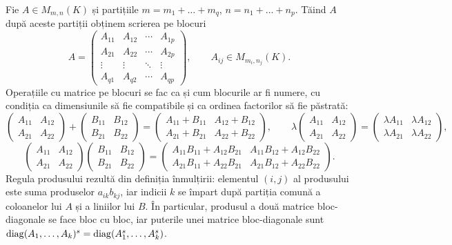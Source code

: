 Fie $A\in M_{m,n}(K)$ și partițiile $m=m_1+\dots+m_q$, $n=n_1+\dots+n_p$. Tăind $A$ după aceste partiții obținem scrierea pe blocuri
\[
A=
\begin{pmatrix}
A_{11} & A_{12} & \cdots & A_{1p}\\
A_{21} & A_{22} & \cdots & A_{2p}\\
\vdots & \vdots & \ddots & \vdots\\
A_{q1} & A_{q2} & \cdots & A_{qp}
\end{pmatrix},
\qquad A_{ij}\in M_{m_i,n_j}(K).
\]
Operațiile cu matrice pe blocuri se fac ca și cum blocurile ar fi numere, cu condiția ca dimensiunile să fie compatibile și ca ordinea factorilor să fie păstrată:
\[
\begin{pmatrix}A_{11}&A_{12}\\A_{21}&A_{22}\end{pmatrix}+\begin{pmatrix}B_{11}&B_{12}\\B_{21}&B_{22}\end{pmatrix}=\begin{pmatrix}A_{11}+B_{11}&A_{12}+B_{12}\\A_{21}+B_{21}&A_{22}+B_{22}\end{pmatrix},\qquad
\lambda\begin{pmatrix}A_{11}&A_{12}\\A_{21}&A_{22}\end{pmatrix}=\begin{pmatrix}\lambda A_{11}&\lambda A_{12}\\\lambda A_{21}&\lambda A_{22}\end{pmatrix},
\]
\[
\begin{pmatrix}A_{11}&A_{12}\\A_{21}&A_{22}\end{pmatrix}\begin{pmatrix}B_{11}&B_{12}\\B_{21}&B_{22}\end{pmatrix}=
\begin{pmatrix}
A_{11}B_{11}+A_{12}B_{21} & A_{11}B_{12}+A_{12}B_{22}\\
A_{21}B_{11}+A_{22}B_{21} & A_{21}B_{12}+A_{22}B_{22}
\end{pmatrix}.
\]
Regula produsului rezultă din definiția înmulțirii: elementul $(i,j)$ al produsului este suma produselor $a_{ik}b_{kj}$, iar indicii $k$ se împart după partiția comună a coloanelor lui $A$ și a liniilor lui $B$. În particular, produsul a două matrice bloc-diagonale se face bloc cu bloc, iar puterile unei matrice bloc-diagonale sunt $\operatorname{diag}(A_1,\dots,A_k)^s=\operatorname{diag}(A_1^s,\dots,A_k^s)$.

